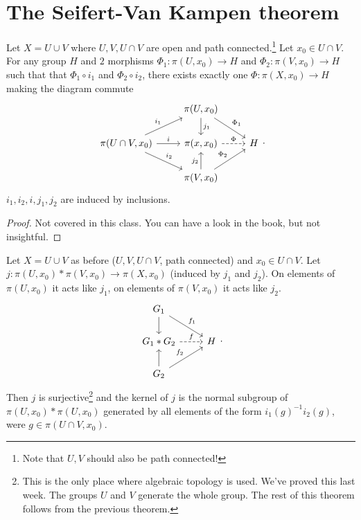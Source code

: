 \section{The Seifert-Van Kampen theorem}
\begin{theorem}[70.1]
    Let $X = U \cup V$ where $U, V, U \cap V$ are open and path connected.\footnote{Note that $U, V$ should also be path connected!}
    Let $x_0 \in  U \cap V$.
    For any group $H$ and $2$ morphisms  $\Phi_1: \pi(U, x_0) \to  H$ and $\Phi_2: \pi(V, x_0) \to  H$ such that that $\Phi_1  \circ i_1$ and $\Phi_2  \circ i_2$, there exists exactly one $\Phi: \pi(X, x_0) \to H$ making the diagram commute
    \[
    \begin{tikzcd}
        & \pi(U, x_0) \arrow[d, "j_1"] \arrow[dr, "\Phi_1"] &\\
        \pi(U \cap V, x_0) \arrow[u r, "i_1"] \arrow[r, "i"] \arrow[dr, "i_2"]& \pi(x, x_0) \arrow[r, dashed, "\Phi"]& H\\
                                                                                   & \pi(V, x_0) \arrow[u, "j_2"] \arrow[u r, "\Phi_2"] &
    \end{tikzcd}
    .\] 
    $i_1, i_2, i, j_1, j_2$ are induced by inclusions.
\end{theorem}
\begin{proof}
    Not covered in this class.
    You can have a look in the book, but not insightful.
\end{proof}
\begin{theorem}
    Let $X = U \cup V$ as before ($U, V, U \cap V$, path connected) and $x_0 \in  U \cap V$.
    Let $j: \pi(U, x_0) * \pi(V, x_0) \to \pi(X, x_0)$ (induced by $j_1$ and $j_2$). On elements of $\pi(U, x_0)$ it acts like $j_1$, on elements of $\pi(V, x_0)$ it acts like $j_2$.
    \[
    \begin{tikzcd}
        G_1 \arrow[d] \arrow[dr, "f_1"]&\\
        G_1 * G_2 \arrow[r, dashed, "f"]& H\\
        G_2 \arrow[u] \arrow[ur, "f_2"] &
    \end{tikzcd}
    .\] 
    Then $j$ is surjective\footnote{This is the only place where algebraic topology is used. We've proved this last week. The groups $U$ and $V$ generate the whole group. The rest of this theorem follows from the previous theorem.} and the kernel of $j$ is the normal subgroup of $\pi(U, x_0) * \pi(U, x_0)$ generated by all elements of the form $i_1(g)^{-1} i_2(g)$, were $g\in \pi(U \cap V, x_0)$.
\end{theorem}
